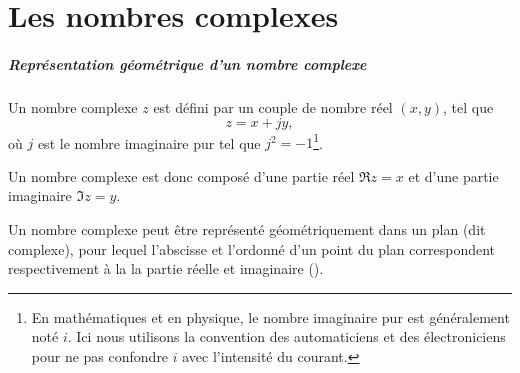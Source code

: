 \chapter{Les nombres complexes\label{annexe-NC}}
\paragraph[Représentation d'un nombre complexe]
          {Représentation géométrique d'un nombre complexe}
Un nombre complexe $z$ est défini par un couple 
de nombre réel $(x,y)$, tel que 
\[
z=x+jy,
\]
où $j$ est le nombre imaginaire pur tel que $j^2=-1$\footnote{En mathématiques 
et en physique, le nombre imaginaire pur est généralement noté $i$. Ici nous 
utilisons la convention des automaticiens et des électroniciens pour ne
pas confondre $i$ avec l'intensité du courant.}.

Un nombre complexe est donc composé d'une partie 
réel $\Re{z}=x$ et d'une partie imaginaire $\Im{z}=y$.

Un nombre complexe peut être représenté géométriquement dans un plan 
(dit complexe), pour lequel l'abscisse et l'ordonné d'un 
point du plan correspondent respectivement 
à la la partie réelle et imaginaire ().
